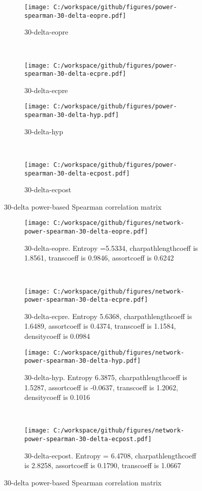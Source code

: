 \documentclass[11pt, onecolumn]{article}
\begin{document}
\begin{figure*}[t!]
    \centering
    \begin{subfigure}[t]{0.5\textwidth}
        \centering
        \texttt{[image: C:/workspace/github/figures/power-spearman-30-delta-eopre.pdf]}
        \caption{30-delta-eopre}
    \end{subfigure}%
    ~ 
    \begin{subfigure}[t]{0.5\textwidth}
        \centering
        \texttt{[image: C:/workspace/github/figures/power-spearman-30-delta-ecpre.pdf]}
        \caption{30-delta-ecpre}
    \end{subfigure}
        \begin{subfigure}[t]{0.5\textwidth}
        \centering
        \texttt{[image: C:/workspace/github/figures/power-spearman-30-delta-hyp.pdf]}
        \caption{30-delta-hyp}
    \end{subfigure}%
    ~ 
    \begin{subfigure}[t]{0.5\textwidth}
        \centering
        \texttt{[image: C:/workspace/github/figures/power-spearman-30-delta-ecpost.pdf]}
        \caption{30-delta-ecpost}
    \end{subfigure}
    \caption{30-delta power-based Spearman correlation matrix}
\end{figure*}
\begin{figure*}[t!]
    \centering
    \begin{subfigure}[t]{0.5\textwidth}
        \centering
        \texttt{[image: C:/workspace/github/figures/network-power-spearman-30-delta-eopre.pdf]}
        \caption{30-delta-eopre. Entropy =5.5334, charpathlengthcoeff is
    1.8561, transcoeff is
    0.9846, assortcoeff is
    0.6242}
    \end{subfigure}%
    ~ 
    \begin{subfigure}[t]{0.5\textwidth}
        \centering
        \texttt{[image: C:/workspace/github/figures/network-power-spearman-30-delta-ecpre.pdf]}
        \caption{30-delta-ecpre. Entropy 5.6368, charpathlengthcoeff is
    1.6489, assortcoeff is
    0.4374, transcoeff is
    1.1584, densitycoeff is
    0.0984}
    \end{subfigure}
        \begin{subfigure}[t]{0.5\textwidth}
        \centering
        \texttt{[image: C:/workspace/github/figures/network-power-spearman-30-delta-hyp.pdf]}
        \caption{30-delta-hyp. Entropy 6.3875, charpathlengthcoeff is 1.5287, assortcoeff is -0.0637, transcoeff is 1.2062, densitycoeff is 0.1016}
    \end{subfigure}%
    ~ 
    \begin{subfigure}[t]{0.5\textwidth}
        \centering
        \texttt{[image: C:/workspace/github/figures/network-power-spearman-30-delta-ecpost.pdf]}
        \caption{30-delta-ecpost. Entropy = 6.4708, charpathlengthcoeff is
    2.8258, assortcoeff is
    0.1790, transcoeff is
    1.0667}
    \end{subfigure}
    \caption{30-delta power-based Spearman correlation matrix}
\end{figure*}
\end{document}
